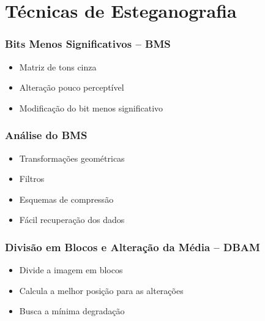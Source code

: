 \documentclass{beamer}
\begin{document}
\section{Técnicas de Esteganografia}
\begin{frame}
\frametitle{Bits Menos Significativos -- BMS}

\begin{itemize}
\item Matriz de tons cinza\newline
\item Alteração pouco perceptível\newline
\item Modificação do bit menos significativo

\end{itemize}

\end{frame}
\begin{frame}
\frametitle{Análise do BMS}

\begin{itemize}
\item Transformações geométricas\newline
\item Filtros\newline
\item Esquemas de compressão\newline
\item Fácil recuperação dos dados
\end{itemize}

\end{frame}
\begin{frame}
\frametitle{Divisão em Blocos e Alteração da Média -- DBAM}

\begin{itemize}
\item Divide a imagem em blocos \newline
\item Calcula a melhor posição para as alterações\newline
\item Busca a mínima degradação 
\end{itemize}
\end{frame}
\end{document}
